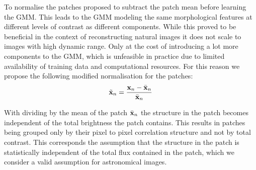\documentclass[twocolumn]{aastex631}
\DeclareMathOperator{\arcsinh}{arcsinh}
\newcommand{\todo}[1]{\textcolor{red}{TODO: #1}\PackageWarning{TODO:}{#1!}}
\begin{document}
    To normalise the patches \cite{Zoran2011} proposed to subtract the patch mean before learning the GMM. This leads to the GMM modeling the same morphological features at different levels of contrast as different components. While this proved to be beneficial in the context of reconstructing natural images it does not scale to images with high dynamic range. Only at the cost of introducing a lot more components to the GMM, which is unfeasible in practice due to limited availability of training data and computational resources. For this reason we propose the following modified normalisation for the patches:
    \begin{equation}
        \label{eq:patch-norm}
        \tilde{\mathbf{x}}_n = \frac{\mathbf{x}_n - \Bar{\mathbf{x}}_n}{\Bar{\mathbf{x}}_n}
    \end{equation}
    
    With dividing by the mean of the patch $\Bar{\mathbf{x}}_n$ the structure in the patch becomes independent of the total brightness the patch contains. This results in patches being grouped only by their pixel to pixel correlation structure and not by total contrast. This corresponds the assumption that the structure in the patch is statistically independent of the total flux contained in the patch, which we consider a valid assumption for astronomical images.
    
    



\end{document}
